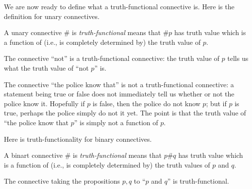 We are now ready to define what a truth-functional connective is. Here is the definition for unary connectives.
\begin{definition}
	A unary connective $\#$ is \textit{truth-functional} means that $\#p$ has truth value which is a function of (i.e., is completely determined by) the truth value of $p$.
\end{definition}
\begin{example}
	The connective ``not'' is a truth-functional connective: the truth value of $p$ tells us what the truth value of ``not $p$'' is.
\end{example}
\begin{nex}
	The connective ``the police know that'' is not a truth-functional connective: a statement being true or false does not immediately tell us whether or not the police know it. Hopefully if $p$ is false, then the police do not know $p$; but if $p$ is true, perhaps the police simply do not it yet. The point is that the truth value of ``the police know that $p$'' is simply not a function of $p$.
\end{nex}
Here is truth-functionality for binary connectives.
\begin{definition}
	A binart connective $\#$ is \textit{truth-functional} means that $p\#q$ has truth value which is a function of (i.e., is completely determined by) the truth values of $p$ and $q$.
\end{definition}
\begin{example}
	The connective taking the propositions $p,q$ to ``$p$ and $q$'' is truth-functional.
\end{example}